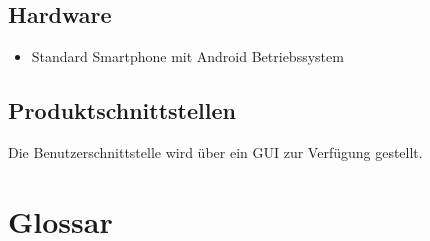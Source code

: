 \documentclass[parskip=full]{scrartcl}
\begin{document}
\subsection{Hardware}
\begin{itemize}
    \item Standard Smartphone mit Android Betriebssystem
\end{itemize}

\subsection{Produktschnittstellen}
Die Benutzerschnittstelle wird über ein GUI zur Verfügung gestellt.

\section{Glossar}
\end{document}
